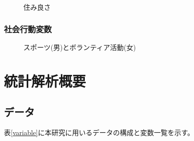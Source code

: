 \begin{figure}[h!]
	\begin{center}
		\caption{住み良さ}
	\end{center}
\end{figure}


\subsection{社会行動変数}

\begin{figure}[h!]
	\begin{center}
		\caption{スポーツ(男)とボランティア活動(女)}\label{fig17}
	\end{center}
\end{figure}



%

\chapter{統計解析概要}
\section{データ}
表\ref{variable}に本研究に用いるデータの構成と変数一覧を示す。

